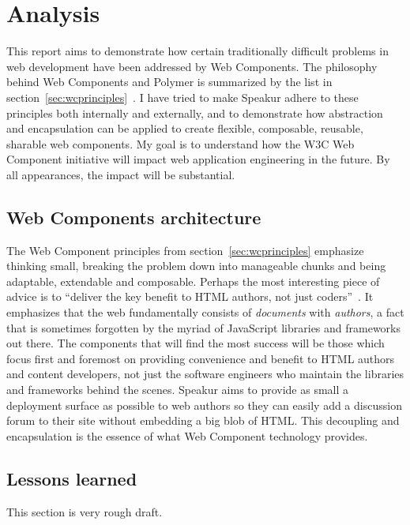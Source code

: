 \chapter{Analysis}
%

This report aims to demonstrate how certain traditionally difficult problems in web development have been addressed by Web Components.
The philosophy behind Web Components and Polymer is summarized by the list in section~\ref{sec:wcprinciples}~\cite{webcomponentscontributors2014}.
I have tried to make Speakur adhere to these principles both internally and externally,
and to demonstrate how abstraction and encapsulation can be applied to create flexible, composable, reusable, sharable web components.
My goal is to understand how the W3C Web Component initiative will impact web application engineering in the future.
By all appearances, the impact will be substantial.

\section{Web Components architecture}
The Web Component principles from section~\ref{sec:wcprinciples} emphasize thinking small, 
breaking the problem down into manageable chunks and being adaptable, extendable and composable.
Perhaps the most interesting piece of advice is to ``deliver the key benefit to HTML authors, not just coders''~\cite{webcomponentscontributors2014}.
It emphasizes that the web fundamentally consists of \textit{documents} with \textit{authors}, 
a fact that is sometimes forgotten by the myriad of JavaScript libraries and frameworks out there.
The components that will find the most success will be those which focus first and foremost on providing convenience and benefit to HTML authors and content developers, 
not just the software engineers who maintain the libraries and frameworks behind the scenes.
Speakur aims to provide as small a deployment surface as possible to web authors so they can easily add a discussion forum to their site without embedding a big blob of HTML.
This decoupling and encapsulation is the essence of what Web Component technology provides.

\section{Lessons learned}
This section is very rough draft.

